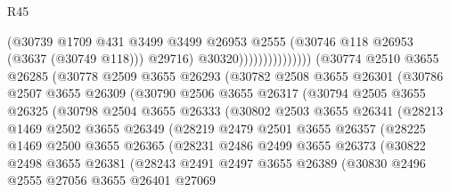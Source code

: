 \begin{lexlean}{R45}
\begin{coremodule}
                                      (@30739
                                        @1709
                                        @431
                                        @3499
                                        @3499
                                        @26953
                                        @2555
                                        (@30746 @118 @26953 (@3637 (@30749 @118)))
                                        @29716)
                                      @30320)))))))))))))))
        (@30774
          @2510
          @3655
          @26285
          (@30778
            @2509
            @3655
            @26293
            (@30782
              @2508
              @3655
              @26301
              (@30786
                @2507
                @3655
                @26309
                (@30790
                  @2506
                  @3655
                  @26317
                  (@30794
                    @2505
                    @3655
                    @26325
                    (@30798
                      @2504
                      @3655
                      @26333
                      (@30802
                        @2503
                        @3655
                        @26341
                        (@28213
                          @1469
                          @2502
                          @3655
                          @26349
                          (@28219
                            @2479
                            @2501
                            @3655
                            @26357
                            (@28225
                              @1469
                              @2500
                              @3655
                              @26365
                              (@28231
                                @2486
                                @2499
                                @3655
                                @26373
                                (@30822
                                  @2498
                                  @3655
                                  @26381
                                  (@28243
                                    @2491
                                    @2497
                                    @3655
                                    @26389
                                    (@30830
                                      @2496
                                      @2555
                                      @27056
                                      @3655
                                      @26401
                                      @27069

\end{coremodule}
\end{lexlean}

